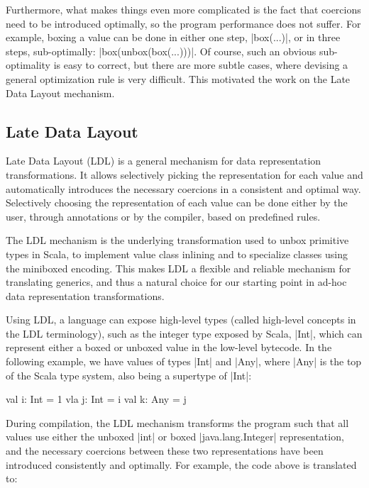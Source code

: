 Furthermore, what makes things even more complicated is the fact that coercions need to be introduced optimally, so the program performance does not suffer. For example, boxing a value can be done in either one step, |box(...)|, or in three steps, sub-optimally: |box(unbox(box(...)))|. Of course, such an obvious sub-optimality is easy to correct, but there are more subtle cases, where devising a general optimization rule is very difficult. This motivated the work on the Late Data Layout mechanism.

\subsection {Late Data Layout}

Late Data Layout (LDL) is a general mechanism for data representation transformations. It allows selectively picking the representation for each value and automatically introduces the necessary coercions in a consistent and optimal way. Selectively choosing the representation of each value can be done either by the user, through annotations or by the compiler, based on predefined rules.

The LDL mechanism is the underlying transformation used to unbox primitive types in Scala, to implement value class inlining and to specialize classes using the miniboxed encoding. This makes LDL a flexible and reliable mechanism for translating generics, and thus a natural choice for our starting point in ad-hoc data representation transformations.

Using LDL, a language can expose high-level types (called high-level concepts in the LDL terminology), such as the integer type exposed by Scala, |Int|, which can represent either a boxed or unboxed value in the low-level bytecode. In the following example, we have values of types |Int| and |Any|, where |Any| is the top of the Scala type system, also being a supertype of |Int|:

\begin{lstlisting-nobreak}
val i: Int = 1
vla j: Int = i
val k: Any = j
\end{lstlisting-nobreak}

During compilation, the LDL mechanism transforms the program such that all values use either the unboxed |int| or boxed |java.lang.Integer| representation, and the necessary coercions between these two representations have been introduced consistently and optimally. For example, the code above is translated to:

